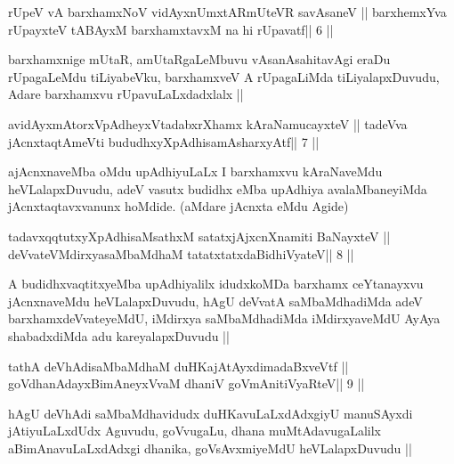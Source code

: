 
\begin{shl}
rUpeV vA barxhamxNoV vidAyxnUmxtARmUteVR savAsaneV ||
barxhemxYva rUpayxteV tABAyxM barxhamxtavxM na hi rUpavatf\hfill || 6 ||
\end{shl}

\begin{artha}
barxhamxnige mUtaR, amUtaRgaLeMbuvu vAsanAsahitavAgi eraDu rUpagaLeMdu
tiLiyabeVku, barxhamxveV A rUpagaLiMda tiLiyalapxDuvudu, Adare
barxhamxvu rUpavuLaLxdadxlalx ||
\end{artha}



\begin{shl}
avidAyxmAtorxVpAdheyxVtadabxrXhamx kAraNamucayxteV ||
tadeVva jAcnxtaqtAmeVti bududhxyXpAdhisamAsharxyAtf\hfill || 7 ||
\end{shl}

\begin{artha}
ajAcnxnaveMba oMdu upAdhiyuLaLx I barxhamxvu kAraNaveMdu
heVLalapxDuvudu, adeV vasutx budidhx eMba upAdhiya avalaMbaneyiMda
jAcnxtaqtavxvanunx hoMdide. (aMdare jAcnxta eMdu Agide)
\end{artha}



\begin{shl}
tadavxqqtutxyXpAdhisaMsathxM satatxjAjxcnXnamiti BaNayxteV ||
deVvateVMdirxyasaMbaMdhaM tatatxtatxdaBidhiVyateV\hfill || 8 ||
\end{shl}

\begin{artha}
A budidhxvaqtitxyeMba upAdhiyalilx idudxkoMDa barxhamx ceYtanayxvu
jAcnxnaveMdu heVLalapxDuvudu, hAgU deVvatA saMbaMdhadiMda adeV
barxhamxdeVvateyeMdU, iMdirxya saMbaMdhadiMda iMdirxyaveMdU AyAya
shabadxdiMda adu kareyalapxDuvudu ||
\end{artha}



\begin{shl}
tathA deVhAdisaMbaMdhaM duHKajAtAyxdimadaBxveVtf ||
goVdhanAdayxBimAneyxVvaM dhaniV goVmAnitiVyaRteV\hfill || 9 ||
\end{shl}

\begin{artha}
hAgU deVhAdi saMbaMdhavidudx duHKavuLaLxdAdxgiyU
manuSAyxdi jAtiyuLaLxdUdx Aguvudu, goVvugaLu, dhana muMtAdavugaLalilx
aBimAnavuLaLxdAdxgi dhanika, goVsAvxmiyeMdU heVLalapxDuvudu || 
\end{artha}


